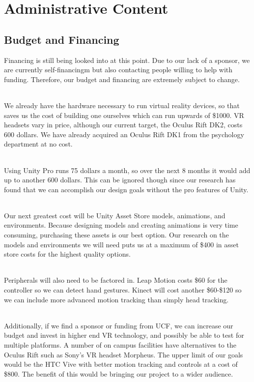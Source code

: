 \documentclass[a4paper,10pt]{article}
\begin{document}
\section{Administrative Content}
\subsection{Budget and Financing}
Financing is still being looked into at this point. Due to our lack of a sponsor, we are currently self-financingm but also contacting people willing to help with funding. Therefore, our budget and financing are extremely subject to change. 
\par~\\ 
We already have the hardware necessary to run virtual reality devices, so that saves us the cost of building one ourselves which can run upwards of \$1000. VR headsets vary in price, although our current target, the Oculus Rift DK2, costs 600 dollars. We have already acquired an Oculus Rift DK1 from the psychology department at no cost.
\par~\\ 
Using Unity Pro runs 75 dollars a month, so over the next 8 months it would add up to another 600 dollars. This can be ignored though since our research has found that we can accomplish our design goals without the pro features of Unity.
\par~\\ 
Our next greatest cost will be Unity Asset Store models, animations, and environments. Because designing models and creating animations is very time consuming, purchasing these assets is our best option. Our research on the models and environments we will need puts us at a maximum of \$400 in asset store costs for the highest quality options.
\par~\\
Peripherals will also need to be factored in. Leap Motion costs \$60 for the controller so we can detect hand gestures. Kinect will cost another \$60-\$120 so we can include more advanced motion tracking than simply head tracking.
\par~\\ 
Additionally, if we find a sponsor or funding from UCF, we can increase our budget and invest in higher end VR technology, and possibly be able to test for multiple platforms. A number of on campus facilities have alternatives to the Oculus Rift such as Sony’s VR headset Morpheus. The upper limit of our goals would be the HTC Vive with better motion tracking and controls at a cost of \$800. The benefit of this would be bringing our project to a wider audience.
\end{document}
